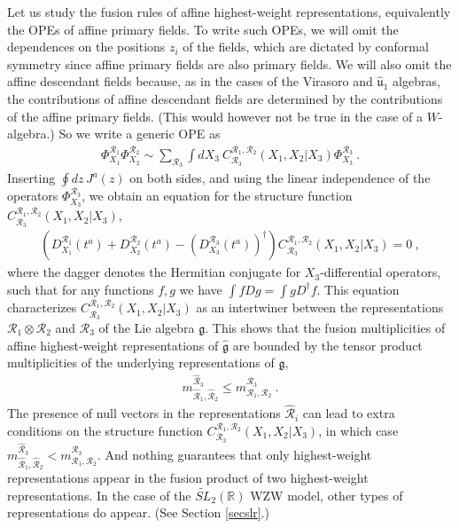 \documentclass[12pt, a4paper, notitlepage, twoside]{report}
\numberwithin{equation}{section}
\theoremstyle{break}
\begin{document}
Let us study the fusion rules of affine highest-weight representations, equivalently the OPEs of affine primary fields.
To write such OPEs, we will omit the dependences on the positions $z_i$ of the fields, which are dictated by conformal symmetry since affine primary fields are also primary fields.
We will also omit the affine descendant fields because, as in the cases of the Virasoro and $\hat{\mathfrak{u}}_1$ algebras, the contributions of affine descendant fields are determined by the contributions of the affine primary fields. (This would however not be true in the case of a $W$-algebra.) So we write a generic OPE as 
\begin{align}
 \Phi^{\mathcal{R}_1}_{X_1}\Phi^{\mathcal{R}_2}_{X_2} \sim \sum_{\mathcal{R}_3} \int dX_3\ C^{\mathcal{R}_1,\mathcal{R}_2}_{\mathcal{R}_3}(X_1,X_2|X_3) \Phi^{\mathcal{R}_3}_{X_3}\ .
\end{align}
Inserting $\oint dz\, J^a(z)$ on both sides, and using the linear independence of the operators $\Phi^{\mathcal{R}_3}_{X_3}$, we obtain an equation for the structure function $C^{\mathcal{R}_1,\mathcal{R}_2}_{\mathcal{R}_3}(X_1,X_2|X_3)$,
\begin{align}
 \left(D_{X_1}^{\mathcal{R}_1}(t^a)+D_{X_2}^{\mathcal{R}_2}(t^a)-\left(D_{X_3}^{\mathcal{R}_3}(t^a)\right)^\dagger\right) C^{\mathcal{R}_1,\mathcal{R}_2}_{\mathcal{R}_3}(X_1,X_2|X_3) = 0\ ,
\label{dddc}
\end{align}
where the dagger denotes the Hermitian conjugate for $X_3$-differential operators, such that for any functions $f,g$ we have 
$\int fDg =\int g D^\dagger f$.
This equation characterizes $C^{\mathcal{R}_1,\mathcal{R}_2}_{\mathcal{R}_3}(X_1,X_2|X_3)$ as an intertwiner between the representations $\mathcal{R}_1\otimes \mathcal{R}_2$ and $\mathcal{R}_3$ of the Lie algebra $\mathfrak{g}$.
This shows that the fusion multiplicities of affine highest-weight representations of $\hat{\mathfrak{g}}$ are bounded by the tensor product multiplicities of the underlying representations of $\mathfrak{g}$, 
\begin{align}
 m_{\hat{\mathcal{R}}_1,\hat{\mathcal{R}}_2}^{\hat{\mathcal{R}}_3} \leq m_{\mathcal{R}_1,\mathcal{R}_2}^{\mathcal{R}_3}\ .
\end{align}
The presence of null vectors in the representations $\hat{\mathcal{R}}_i$ can lead to extra conditions on the structure function $C^{\mathcal{R}_1,\mathcal{R}_2}_{\mathcal{R}_3}(X_1,X_2|X_3)$, in which case $m_{\hat{\mathcal{R}}_1,\hat{\mathcal{R}}_2}^{\hat{\mathcal{R}}_3} < m_{\mathcal{R}_1,\mathcal{R}_2}^{\mathcal{R}_3}$. 
And nothing guarantees that only highest-weight representations appear in the fusion product of two highest-weight representations. 
In the case of the $\widetilde{SL}_2(\mathbb{R})$ WZW model, other types of representations do appear. (See Section \ref{secslr}.) 
\end{document}
